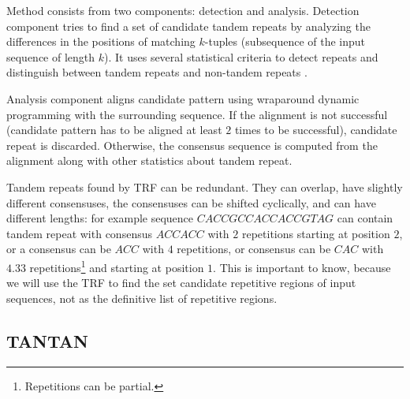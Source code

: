Method consists from two components: detection and analysis. Detection
component tries to find a set of candidate tandem repeats by analyzing the
differences in the positions of matching $k$-tuples (subsequence of the input
sequence of length $k$). It uses several statistical criteria to detect repeats
and distinguish between tandem repeats and non-tandem repeats
\cite{Benson1999}.

Analysis component aligns candidate pattern using wraparound dynamic
programming \cite{Myers1989} with the surrounding sequence. If the alignment is
not successful (candidate pattern has to be aligned at least $2$ times to be
successful), candidate repeat is discarded. Otherwise, the consensus sequence
is computed from the alignment along with other statistics about tandem repeat.

Tandem repeats found by TRF can be redundant.  They can overlap, have slightly
different consensuses, the consensuses can be shifted cyclically, and can have
different lengths: for example sequence $CACCGCCACCACCGTAG$ can contain tandem
repeat with consensus $ACCACC$ with $2$ repetitions starting at position $2$,
or a consensus can be $ACC$ with $4$ repetitions, or consensus can be $CAC$
with $4.33$ repetitions\footnote{Repetitions can be partial.} and starting at
position $1$.  This is important to know, because we will use the TRF to find
the set candidate repetitive regions of input sequences, not as the definitive
list of repetitive regions.

\subsection{TANTAN}

